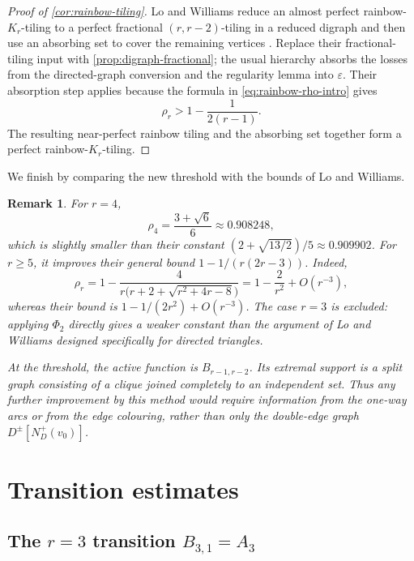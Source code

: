 \documentclass[10pt]{article}
\numberwithin{equation}{section}
\newtheorem{remark}[remark]{Remark}
\newcommand{\eps}{\varepsilon}
\begin{document}
\begin{proof}[Proof of \cref{cor:rainbow-tiling}]
Lo and Williams reduce an almost perfect rainbow-$K_r$-tiling to a perfect fractional $(r,r-2)$-tiling in a reduced digraph and then use an absorbing set to cover the remaining vertices \cite[Sections~4--7]{LW24}.  Replace their fractional-tiling input with \cref{prop:digraph-fractional}; the usual hierarchy absorbs the losses from the directed-graph conversion and the regularity lemma into $\eps$.  Their absorption step applies because the formula in \cref{eq:rainbow-rho-intro} gives
\[
 \rho_r>1-\frac1{2(r-1)}.
\]
The resulting near-perfect rainbow tiling and the absorbing set together form a perfect rainbow-$K_r$-tiling.
\end{proof}

We finish by comparing the new threshold with the bounds of Lo and Williams.

\begin{remark}\label{rem:rainbow-comparison}
For $r=4$,
\[
 \rho_4=\frac{3+\sqrt6}{6}\approx0.908248,
\]
which is slightly smaller than their constant $(2+\sqrt{13/2})/5\approx0.909902$.  For $r\ge5$, it improves their general bound $1-1/(r(2r-3))$.  Indeed,
\[
 \rho_r
 =1-\frac4{r\bigl(r+2+\sqrt{r^2+4r-8}\bigr)}
 =1-\frac2{r^2}+O(r^{-3}),
\]
whereas their bound is $1-1/(2r^2)+O(r^{-3})$.  The case $r=3$ is excluded: applying $\Phi_2$ directly gives a weaker constant than the argument of Lo and Williams designed specifically for directed triangles.

At the threshold, the active function is $B_{r-1,r-2}$.  Its extremal support is a split graph consisting of a clique joined completely to an independent set.  Thus any further improvement by this method would require information from the one-way arcs or from the edge colouring, rather than only the double-edge graph $D^\pm[N_D^+(v_0)]$.
\end{remark}

\appendix

\section{Transition estimates}\label{app:transition-estimates}

\subsection{The \texorpdfstring{$r=3$ transition $B_{3,1}=A_3$}
{r = 3 transition B(3,1) = A(3)}}\label{app:r3-transition}
\end{document}
